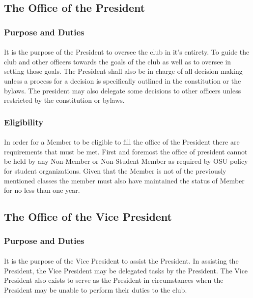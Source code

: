\documentclass[12pt]{article}
\begin{document}
\subsection{The Office of the President}
\subsubsection{Purpose and Duties}
\paragraph{}
It is the purpose of the President to oversee the club in it's entirety. To guide the club and other officers towards the goals of the club as well as to oversee in setting those goals. The President shall
also be in charge of all decision making unless a process for a decision is specifically outlined in the constitution or the bylaws. The president may also delegate some decisions to other officers unless
restricted by the constitution or bylaws.
\subsubsection{Eligibility}
\paragraph{}
In order for a Member to be eligible to fill the office of the President there are requirements that must be met. First and foremost the office of president cannot be held by any Non-Member or Non-Student Member as required by OSU policy for student organizations. Given that the Member is not of the previously mentioned classes the member must also have maintained the status of Member for no less than one year. 

\subsection{The Office of the Vice President}
\subsubsection{Purpose and Duties}
\paragraph{}
It is the purpose of the Vice President to assist the President. In assisting the President, the Vice President may be delegated tasks by the President. The Vice President also exists to serve as the 
President in circumstances when the President may be unable to perform their duties to the club.
\end{document}
